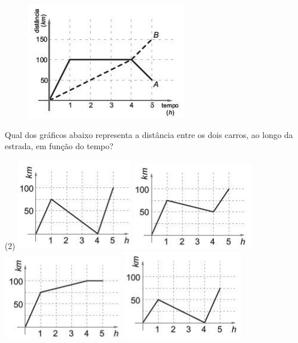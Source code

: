 \documentclass[12pt, a4paper]{article}
\newcommand{\negrito}[1]{\mbox{\boldmath{$#1$}}}
\begin{document}
\begin{figure}[!h]
    \centering
    \includegraphics[scale=1.1]{Figuras/7enc2ciclo1.png}
\end{figure}
Qual dos gráficos abaixo representa a distância entre os dois carros, ao longo da estrada, em função do tempo?
\begin{tasks}[counter-format={(tsk[a])},label-width=3.6ex, label-format = {\bfseries}, column-sep = {0pt}](2)
\task[\textcolor{Floresta}{$\negrito{(a)} $}] \includegraphics[scale=1.1]{Figuras/8enc2ciclo1.png}
\task[\textcolor{Floresta}{$\negrito{(b)} $}] \includegraphics[scale=1.1]{Figuras/9enc2ciclo1.png}
\task[\textcolor{Floresta}{$\negrito{(c)} $}] \includegraphics[scale=1.03]{Figuras/10enc2ciclo1.png}
\task[\textcolor{Floresta}{$\negrito{(d)} $}] 
\includegraphics[scale=1.1]{Figuras/11enc2ciclo1.png}

\end{tasks}
\end{document}
